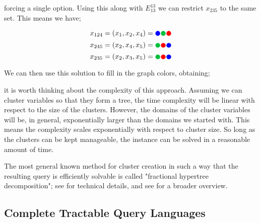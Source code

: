 forcing a single option. Using this along with $E^{13}_{13}$ we can restrict $x_{235}$ to the same set. This means we have;

\begin{equation}
    x_{124} = (x_1, x_2, x_4) = {\color{blue}\CIRCLE} {\color{darkgreen}\CIRCLE} {\color{red}\CIRCLE}
\end{equation}
\begin{equation}
    x_{245} = (x_2, x_4, x_5) = {\color{darkgreen}\CIRCLE} {\color{red}\CIRCLE} {\color{blue}\CIRCLE}
\end{equation}
\begin{equation}
    x_{235} = (x_2, x_3, x_5) = {\color{darkgreen}\CIRCLE} {\color{red}\CIRCLE} {\color{blue}\CIRCLE}
\end{equation}

We can then use this solution to fill in the graph colors, obtaining;

\begin{center}
\end{center}

it is worth thinking about the complexity of this approach. Assuming we can cluster variables so that they form a tree, the time complexity will be linear with respect to the size of the clusters. However, the domains of the cluster variables will be, in general, exponentially larger than the domains we started with. This means the complexity scales exponentially with respect to cluster size. So long as the clusters can be kept manageable, the instance can be solved in a reasonable amount of time.

The most general known method for cluster creation in such a way that the resulting query is efficiently solvable is called "fractional hypertree decomposition"; see \citep{grohe2014constraint} for technical details, and see \citep{marx2013tractable} for a broader overview.

\subsection{Complete Tractable Query Languages}\label{sec:complete-tractable-query-languages}

